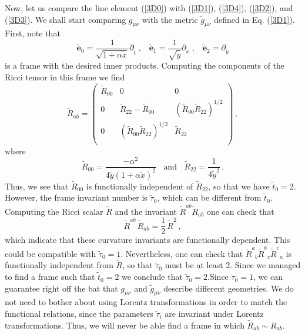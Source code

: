 \documentclass[twocolumn,prd,aps,showpacs,showkeys,amsmath,amssymb]{revtex4-1}
\newcommand{\bl}{\boldsymbol}
\begin{document}
Now, let us compare the line element (\ref{3D0}) with (\ref{3D1}), (\ref{3D4}), (\ref{3D2}), and (\ref{3D3}). We shall start comparing $g_{\mu\nu}$ with the metric $\tilde{g}_{\mu\nu}$ defined in Eq. (\ref{3D1}). First, note that
\begin{equation*}
  \tilde{\bl{e}}_0 = \frac{1}{\sqrt{1+\alpha \tilde{x}} } \partial_{\tilde{t}} \;,\;\;\;
  \tilde{\bl{e}}_1 =   \frac{1}{\sqrt{\tilde{y}}}  \partial_{\tilde{x}} \;,\;\;\;
  \tilde{\bl{e}}_2 =  \partial_{\tilde{y}}
\end{equation*}
is a frame with the desired inner products.
Computing the components of the Ricci tensor in this frame we find
\begin{equation*}
 \tilde{R}_{ab} = \left(
             \begin{array}{ccc}
               \tilde{R}_{00} & 0 & 0 \\
               0 & \tilde{R}_{22} - \tilde{R}_{00} & (\tilde{R}_{00}\tilde{R}_{22})^{1/2} \\
               0 & (\tilde{R}_{00}\tilde{R}_{22})^{1/2} & \tilde{R}_{22} \\
             \end{array}
           \right)\,,
\end{equation*}
where
\begin{equation*}
  \tilde{R}_{00} = \frac{-\alpha^2}{4\tilde{y} (1+\alpha \tilde{x})^2} \;\; \textrm{ and } \;\;   \tilde{R}_{22} = \frac{1}{4\tilde{y}^2}\,.
\end{equation*}
Thus, we see that $\tilde{R}_{00}$ is functionally independent of $\tilde{R}_{22}$, so that we have $\tilde{t}_0 =2$. However, the frame invariant number is $\tilde{\tau}_0$, which can be different from $\tilde{t}_0$. Computing the Ricci scalar $\tilde{R}$ and the invariant $\tilde{R}^{ab}\tilde{R}_{ab}$ one can check that
$$ \tilde{R}^{ab}\,\tilde{R}_{ab} = \frac{1}{2}\,\tilde{R}^2 \,, $$
which indicate that these curvature invariants are functionally dependent. This could be compatible with $\tilde{\tau}_0=1$. Nevertheless, one can check that $\tilde{R}^{a}_{\;\;b} \tilde{R}^{b}_{\;\;c} \tilde{R}^{c}_{\;\;a}$ is functionally independent from $\tilde{R}$, so that $\tilde{\tau}_0$ must be at least 2. Since we managed to find a frame such that $\tilde{t}_0=2$ we conclude that $\tilde{\tau}_0=2$.Since $\tau_0=1$, we can guarantee right off the bat that $g_{\mu\nu}$ and $\tilde{g}_{\mu\nu}$ describe different geometries. We do not need to bother about using Lorentz transformations in order to match the functional relations, since the parameters $\tilde{\tau}_i$ are invariant under Lorentz transformations. Thus, we will never be able find a frame in which $\tilde{R}_{ab} \sim R_{ab}$.
\end{document}
